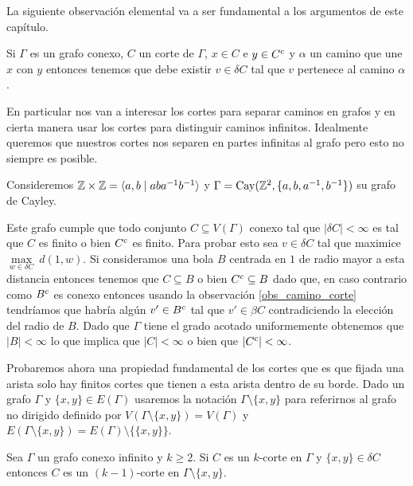 \documentclass[tesis.tex]{subfiles}
\begin{document}
La siguiente observación elemental va a ser fundamental a los argumentos de este capítulo.

\begin{obs}\label{obs_camino_corte}
	Si $\Gamma$ es un grafo conexo, $C$ un corte de $\Gamma$, $x \in C$ e $y \in C^{c}$ y 
	$\alpha$ un camino que une $x$ con $y$ 
	entonces tenemos que debe existir $v \in \delta C$ tal que $v$ pertenece al camino $\alpha$.
\end{obs} 


En particular nos van a interesar los cortes para separar caminos en grafos y en cierta manera usar los cortes para distinguir caminos infinitos.
Idealmente queremos que nuestros cortes nos separen en partes infinitas al grafo pero esto no siempre es posible.

\begin{ej}\label{ej:grilla_corte}
	Consideremos $\mathbb{Z} \times \mathbb{Z} = \langle a,b \mid aba^{-1}b^{-1} \rangle$ y 
	$\Gamma = \text{Cay}(\mathbb{Z}^2, \{ a, b,a^{-1},b^{-1} \})$ su grafo de Cayley.
	
	Este grafo cumple que todo conjunto $C \subseteq V(\Gamma)$ conexo tal que $|\delta C| < \infty$ es tal que $C$ es finito o bien $C^{c}$ es finito.
	Para probar esto sea $v \in \delta C$ tal que
	maximice $\underset{w \in \delta C}{\max} \ d(1,w)$.
	Si consideramos una bola $B$ centrada en $1$ de radio mayor a esta distancia entonces tenemos que $C \subseteq B$ o bien $C^{c} \subseteq B$ dado que, en caso contrario como $B^{c}$ es conexo entonces usando la observación \ref{obs_camino_corte} tendríamos que habría algún $v' \in B^{c}$ tal que $v' \in \beta C$ contradiciendo la elección del radio de $B$.
	Dado que $\Gamma$ tiene el grado acotado uniformemente obtenemos que  $|B| < \infty$ lo que implica que $|C| < \infty$ o bien que $|C^{c}| < \infty$.
\end{ej}

Probaremos ahora una propiedad fundamental de los cortes que es que fijada una arista solo hay finitos cortes que tienen a esta arista dentro de su borde.	
Dado un grafo $\Gamma$ y $\{x,y\} \in E(\Gamma)$  usaremos la notación $\Gamma \setminus \{ x,y \}$ para referirnos al grafo no dirigido definido por $V(\Gamma \setminus \{ x,y \}) = V(\Gamma)$ y $E(\Gamma \setminus \{ x,y \}) = E(\Gamma) \setminus \{\{x,y\}\}$.

\begin{lema}\label{obs_kCorte_restriccion}
	Sea $\Gamma$ un grafo conexo infinito y $k \ge 2$.
	Si $C$ es un $k$-corte en $\Gamma$ y $\{ x,y  \} \in \delta C$ entonces $C$ es un $(k-1)$-corte en $ \Gamma \setminus \{ x,y \} $.
\end{lema}
\end{document}

